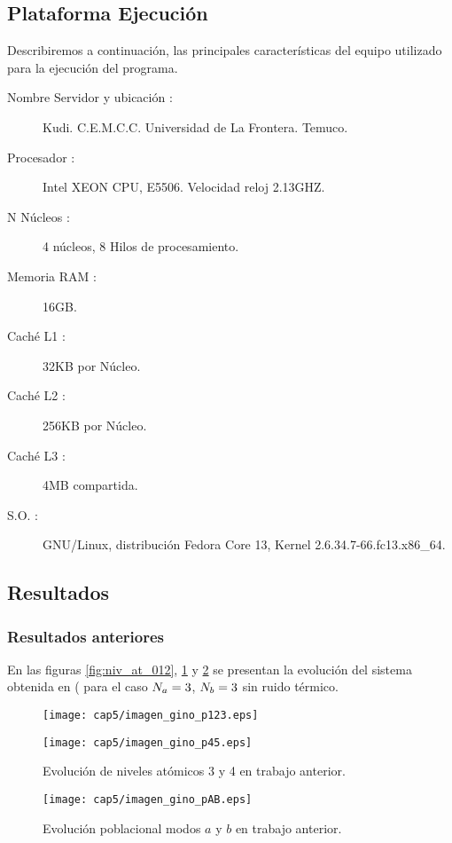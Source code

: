 \subsection{Plataforma Ejecuci\'on}
\quad Describiremos a continuaci\'on, las principales caracter\'isticas del equipo utilizado para la ejecuci\'on del programa.

\begin{description}
 \item[Nombre Servidor y ubicaci\'on : ] Kudi. C.E.M.C.C. Universidad de La Frontera. Temuco.
\item[Procesador : ] Intel XEON CPU, E5506. Velocidad reloj 2.13GHZ.
\item[N\textdegree{} N\'ucleos :] 4 n\'ucleos, 8 Hilos de procesamiento.
\item[Memoria RAM : ] 16GB.
\item[Cach\'e L1 : ] 32KB por N\'ucleo.
\item[Cach\'e L2 : ] 256KB por N\'ucleo.
\item[Cach\'e L3 : ] 4MB compartida.
\item[S.O. : ] GNU/Linux, distribuci\'on Fedora Core 13, Kernel 2.6.34.7-66.fc13.x86\_64.
\end{description}

\subsection{Resultados}

\subsubsection{Resultados anteriores}
En las figuras \ref{fig:niv_at_012}, \ref{fig:niv_at_34} y \ref{fig:modos_ab} se presentan la evoluci\'on del sistema obtenida en (\cite{gino} para el caso $N_a=3$, $N_b=3$ sin ruido t\'ermico.

\begin{figure}[!ht]
\centering
 \texttt{[image: cap5/imagen\_gino\_p123.eps]}\caption{Evoluci\'on de niveles at\'omicos 0, 1 y 2 en trabajo anterior.}\label{fig:niv_at_012}
 \texttt{[image: cap5/imagen\_gino\_p45.eps]}\caption{Evoluci\'on de niveles at\'omicos 3 y 4 en trabajo anterior.}\label{fig:niv_at_34}
\end{figure}
\begin{figure}[!ht]
\centering
 \texttt{[image: cap5/imagen\_gino\_pAB.eps]}\caption{Evoluci\'on poblacional modos $a$ y $b$ en trabajo anterior.}\label{fig:modos_ab}
\end{figure}

